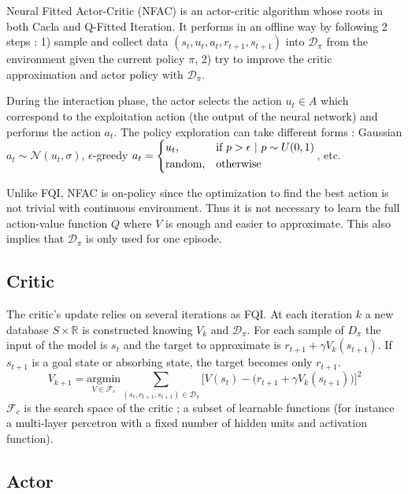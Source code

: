 Neural Fitted Actor-Critic (NFAC) is an actor-critic algorithm whose roots in both Cacla and Q-Fitted Iteration.
It performs in an offline way by following 2 steps : 1) sample and collect data $(s_t, u_t, a_t, r_{t+1}, s_{t+1})$ into $\mathcal{D}_\pi$
from the environment given the current policy $\pi$, 2) try to improve the critic approximation and actor policy with $\mathcal{D}_\pi$.

During the interaction phase, the actor selects the action $u_t \in A$  which correspond to the exploitation action (the output of the neural network)
and performs the action $a_t$. The policy exploration can take different forms : Gaussian $a_t \sim \mathcal{N}(u_t, \sigma)$, 
$\epsilon$-greedy 
$a_t = 
\begin{dcases} u_t, & \text{if }p > \epsilon\ |\ p \sim U(0,1) \\
      \text{random}, & \text{otherwise}
\end{dcases}$, etc.

Unlike FQI, NFAC is on-policy since the optimization to find the best action is not trivial 
with continuous environment. Thus it is not necessary to learn the full action-value function $Q$
where $V$ is enough and easier to approximate. This also implies that $\mathcal{D}_\pi$ is only
used for one episode.

\subsection{Critic}

The critic's update relies on several iterations as FQI. 
At each iteration $k$ a new database $S \times \mathbb{R}$ is constructed knowing $V_k$ and $\mathcal{D}_\pi$.
For each sample of $D_\pi$ the input of the model is $s_t$ and the target to approximate is $r_{t+1} + \gamma V_k(s_{t+1})$.
If $s_{t+1}$ is a goal state or absorbing state, the target becomes only $r_{t+1}$.
\begin{equation}
 V_{k+1} = \underset{V \in \mathcal{F}_c}{\text{argmin}} 
 \sum_{ (s_t, r_{t+1}, s_{t+1}) \in \mathcal{D}_\pi}
 \Big[ V(s_t) - \big( r_{t+1} + \gamma V_k(s_{t+1}) \big) \Big]^2
\end{equation}
$\mathcal{F}_c$ is the search space of the critic ; a subset of learnable functions
(for instance a multi-layer percetron with a fixed number of hidden units and activation function).

\subsection{Actor}

